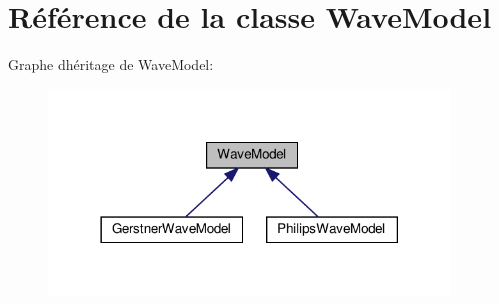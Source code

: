 \hypertarget{class_wave_model}{}\section{Référence de la classe Wave\+Model}
\label{class_wave_model}


Graphe d\textquotesingle{}héritage de Wave\+Model\+:
\nopagebreak
\begin{figure}[H]
\begin{center}
\leavevmode
\includegraphics[width=302pt]{class_wave_model__inherit__graph}
\end{center}
\end{figure}
